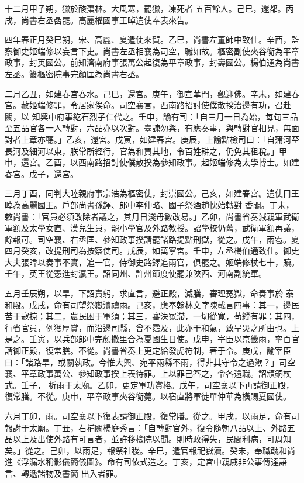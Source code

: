 \begin{pinyinscope}
 十二月甲子朔，獵於酸棗林。大風寒，罷獵，凍死者
 五百餘人。己巳，還都。丙戌，尚書右丞嵒罷。高麗權國事王晫遣使奉表來告。



 四年春正月癸巳朔，宋、高麗、夏遣使來賀。乙巳，尚書左董師中致仕。辛酉，監察御史姬端修以妄言下吏。尚書左丞相襄為司空，職如故。樞密副使夾谷衡為平章政事，封英國公。前知濟南府事張萬公起復為平章政事，封壽國公。楊伯通為尚書左丞。簽樞密院事完顏匡為尚書右丞。



 二月乙丑，如建春宮春水。己巳，還宮。庚午，御宣華門，觀迎佛。辛未，如建春宮。赦姬端修罪，令居家俟命。司空襄言，西南路招討使僕散揆治邊有功，召赴闕，以
 知興中府事紇石烈子仁代之。壬申，諭有司：「自三月一日為始，每旬三品至五品官各一人轉對，六品亦以次對。臺諫勿與，有應奏事，與轉對官相見，無面對者上章亦聽。」乙亥，還宮。戊寅，如建春宮。庚辰，上諭點檢司曰：「自蒲河至長河及細河以東，朕常所經行，官為和買其地，令百姓耕之，仍免其租稅。」甲申，還宮。乙酉，以西南路招討使僕散揆為參知政事。起姬端修為太學博士。如建春宮。戊子，還宮。



 三月丁酉，同判大睦親府事宗浩為樞密使，封崇國公。己亥，如建春宮。遣使冊王晫為高麗國王。戶部尚書孫鐸、郎中李仲略、國子祭酒趙忱始轉對
 香閣。丁未，敕尚書：「官員必須改除者議之，其月日淺毋數改易。」乙卯，尚書省奏減親軍武衛軍額及太學女直、漢兒生員，罷小學官及外路教授。詔學校仍舊，武衛軍額再議，餘報可。司空襄、右丞匡、參知政事揆請罷諸路提點刑獄，從之。戊午，雨雹。夏四月癸亥，改提刑司為按察使司。戊辰，如萬寧宮。壬申，左丞楊伯通致仕。御史大夫張暐以奏事不實，追一官，侍御史路鐸追兩官，俱罷之。姬端修杖七十，贖。壬午，英王從憲進封瀛王。詔同州、許州節度使罷兼陜西、河南副統軍。



 五月壬辰朔，以旱，下詔責躬，求直言，避正殿，減膳，審理冤獄，命奏事於
 泰和殿。戊戌，命有司望祭嶽瀆禱雨。己亥，應奉翰林文字陳載言四事：其一，邊民苦于寇掠；其二，農民困于軍須；其三，審決冤滯，一切從寬，茍縱有罪；其四，行省官員，例獲厚賞，而沿邊司縣，曾不霑及，此亦干和氣，致旱災之所由也。上是之。壬寅，以兵部郎中完顏撒里合為夏國生日使。戊申，宰臣以京畿雨，率百官請御正殿，復常膳。不從。尚書省奏上更定給發虎符制，著于令。庚戌，諭宰臣曰：「諸路旱，或關執政。今惟大興、宛平兩縣不雨，得非其守令之過歟？」司空襄、平章政事萬公、參知政事揆上表待罪。上以罪己答之，令各還職。詔頒銅杖式。壬子，
 祈雨于太廟。乙卯，更定軍功賞格。戊午，司空襄以下再請御正殿，復常膳。不從。庚申，平章政事夾谷衡薨。以宿直將軍徒單仲華為橫賜夏國使。



 六月丁卯，雨。司空襄以下復表請御正殿，復常膳。從之。甲戌，以雨足，命有司報謝于太廟。丁丑，右補闕楊庭秀言：「自轉對官外，復令隨朝八品以上、外路五品以上及出使外路有可言者，並許移檢院以聞。則時政得失，民間利病，可周知矣。」從之。己卯，以雨足，報祭社稷。辛巳，遣官報祀嶽瀆。癸未，奉職醜和尚進《浮漏水稱影儀簡儀圖》。命有司依式造之。丁亥，定宮中親戚非公事傳達語言、轉遞諸物及書簡
 出入者罪。




\end{pinyinscope}
